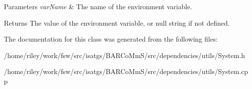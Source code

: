 \begin{DoxyParams}{Parameters}
{\em var\+Name} & The name of the environment variable.\\
\hline
\end{DoxyParams}
\begin{DoxyReturn}{Returns}
The value of the environment variable, or null string if not defined. 
\end{DoxyReturn}


The documentation for this class was generated from the following files\+:\begin{DoxyCompactItemize}
\item 
/home/riley/work/fsw/src/isatgs/\+B\+A\+R\+Co\+Mm\+S/src/dependencies/utils/System.\+h\item 
/home/riley/work/fsw/src/isatgs/\+B\+A\+R\+Co\+Mm\+S/src/dependencies/utils/System.\+cpp\end{DoxyCompactItemize}
